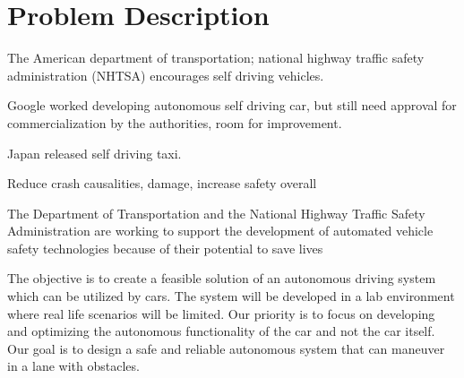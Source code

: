 \documentclass{article}
\begin{document}
\section{Problem Description}

The American department of transportation; national highway traffic safety administration (NHTSA) encourages self driving vehicles.

Google worked developing autonomous self driving car, but still need approval for commercialization by the authorities, room for improvement.

Japan released self driving taxi.

Reduce crash causalities, damage, increase safety overall

The Department of Transportation and the National Highway Traffic Safety Administration are working to support the development of automated vehicle safety technologies because of their potential to save lives \cite{NHTSA231}


The objective is to create a feasible solution of an autonomous driving system which can be utilized by cars. The system will be developed in a lab environment where real life scenarios will be limited. Our priority is to focus on developing and optimizing the autonomous functionality of the car and not the car itself. Our goal is to design a safe and reliable autonomous system that can maneuver in a lane with obstacles. 

\printbibliography
\end{document}
